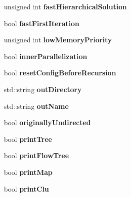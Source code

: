 \begin{DoxyCompactItemize}
\item 
\mbox{\label{structConfig_af8ea45bc2466695c8df8c1eccb2847f5}} 
unsigned int {\bfseries fast\+Hierarchical\+Solution}
\item 
\mbox{\label{structConfig_a8094aede50b5435e09e076db77edf090}} 
bool {\bfseries fast\+First\+Iteration}
\item 
\mbox{\label{structConfig_a2a29a457a042daf11d655d72d99d9e43}} 
unsigned int {\bfseries low\+Memory\+Priority}
\item 
\mbox{\label{structConfig_afdc507ed56f94d46e397b7192a37d8eb}} 
bool {\bfseries inner\+Parallelization}
\item 
\mbox{\label{structConfig_ae3ffc4de9357145b83d9dd1fe6218202}} 
bool {\bfseries reset\+Config\+Before\+Recursion}
\item 
\mbox{\label{structConfig_afb54b465b6e0ee940e3cd2b01de6b9a4}} 
std\+::string {\bfseries out\+Directory}
\item 
\mbox{\label{structConfig_a2f3ea18b97531f01bf14f323250d7c28}} 
std\+::string {\bfseries out\+Name}
\item 
\mbox{\label{structConfig_ad43679bb0316840b369b6ee240bf58e2}} 
bool {\bfseries originally\+Undirected}
\item 
\mbox{\label{structConfig_a98d99c410b7b6d231620bf9bd326d7ce}} 
bool {\bfseries print\+Tree}
\item 
\mbox{\label{structConfig_a7b7d69399b6a0021fd2a2b610b0a2d1f}} 
bool {\bfseries print\+Flow\+Tree}
\item 
\mbox{\label{structConfig_a25b417fcdc173fc527e481dae2f6393a}} 
bool {\bfseries print\+Map}
\item 
\mbox{\label{structConfig_a43f09b5d02e62cd357f14c966f9f6ece}} 
bool {\bfseries print\+Clu}
\item 
\mbox{\label{structConfig_a4df700c5208fccab01413f191309e2ab}} 

\end{DoxyCompactItemize}
